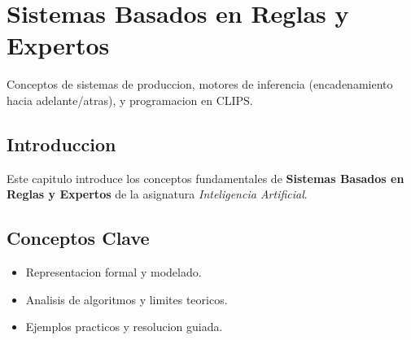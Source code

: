 \chapter{Sistemas Basados en Reglas y Expertos}
\label{ch:sistemas_expertos}

Conceptos de sistemas de produccion, motores de inferencia (encadenamiento hacia adelante/atras), y programacion en CLIPS.

\section{Introduccion}
Este capitulo introduce los conceptos fundamentales de \textbf{Sistemas Basados en Reglas y Expertos} de la asignatura \textit{Inteligencia Artificial}.

\section{Conceptos Clave}
\begin{itemize}
    \item Representacion formal y modelado.
    \item Analisis de algoritmos y limites teoricos.
    \item Ejemplos practicos y resolucion guiada.
\end{itemize}
